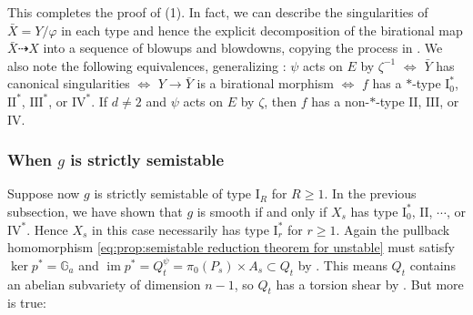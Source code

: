 \documentclass[reqno, letterpaper]{amsart}
\numberwithin{equation}{subsection}
\let\to\longrightarrow
\newcommand{\GG}{\mathbb{G}}
\DeclareMathOperator{\im}{im}
\begin{document}
			This completes the proof of (1). In fact, we can describe the singularities of $\bar X = Y /\varphi$ in each type and hence the explicit decomposition of the birational map $\bar X \dashrightarrow X$ into a sequence of blowups and blowdowns, copying the process in \cite[\S V.10, p.209]{bar-hulek-pet-van:surface}. We also note the following equivalences, generalizing \cite[Proposition~4.24--25]{kim-laza-mar26}: $\psi$ acts on $E$ by $\zeta^{-1}$ $\Longleftrightarrow$ $\bar Y$ has canonical singularities $\Longleftrightarrow$ $Y \to \bar Y$ is a birational morphism $\Longleftrightarrow$ $f$ has a $*$-type $\mathrm I_0^*$, $\mathrm{II}^*$, $\mathrm{III}^*$, or $\mathrm{IV}^*$. If $d \neq 2$ and $\psi$ acts on $E$ by $\zeta$, then $f$ has a non-$*$-type $\mathrm{II}$, $\mathrm{III}$, or $\mathrm{IV}$.
			
			
			
		\subsubsection{When $g$ is strictly semistable}
			Suppose now $g$ is strictly semistable of type $\mathrm I_R$ for $R \ge 1$. In the previous subsection, we have shown that $g$ is smooth if and only if $X_s$ has type $\mathrm I_0^*$, $\mathrm{II}$, $\cdots$, or $\mathrm{IV}^*$. Hence $X_s$ in this case necessarily has type $\mathrm I^*_r$ for $r \ge 1$. Again the pullback homomorphism \eqref{eq:prop:semistable reduction theorem for unstable} must satisfy $\ker p^* = \GG_a$ and $\im p^* = Q_t^\psi = \pi_0(P_s) \times A_s \subset Q_t$ by . This means $Q_t$ contains an abelian subvariety of dimension $n-1$, so $Q_t$ has a torsion shear by . But more is true:
			
\end{document}
